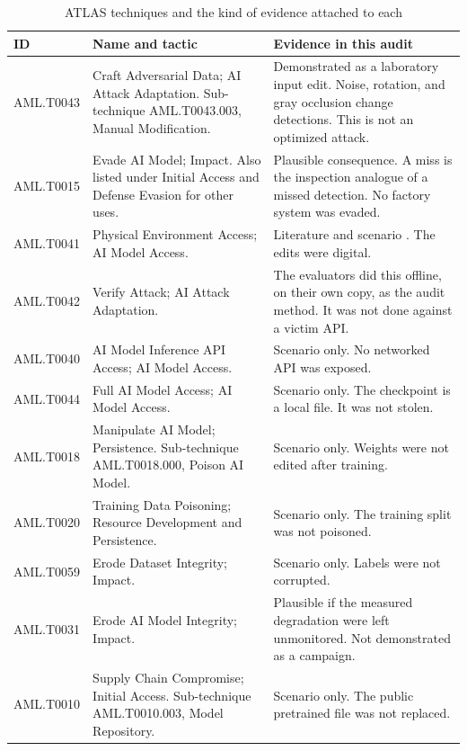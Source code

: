 \documentclass[conference]{IEEEtran}
\begin{document}
\begin{table}[t]
\caption{ATLAS techniques and the kind of evidence attached to each}
\label{tab:atlas}
\centering
\footnotesize
\setlength{\tabcolsep}{4pt}
\begin{tabular}{@{}>{\raggedright\arraybackslash}p{}>{\raggedright\arraybackslash}p{}>{\raggedright\arraybackslash}p{}@{}}
\toprule
ID & Name and tactic & Evidence in this audit \\
\midrule
AML.T0043 & Craft Adversarial Data; AI Attack Adaptation. Sub-technique AML.T0043.003, Manual Modification. & Demonstrated as a laboratory input edit. Noise, rotation, and gray occlusion change detections. This is not an optimized attack. \\
AML.T0015 & Evade AI Model; Impact. Also listed under Initial Access and Defense Evasion for other uses. & Plausible consequence. A miss is the inspection analogue of a missed detection. No factory system was evaded. \\
AML.T0041 & Physical Environment Access; AI Model Access. & Literature and scenario \cite{eykholt2018physical,lee2019patch}. The edits were digital. \\
AML.T0042 & Verify Attack; AI Attack Adaptation. & The evaluators did this offline, on their own copy, as the audit method. It was not done against a victim API. \\
AML.T0040 & AI Model Inference API Access; AI Model Access. & Scenario only. No networked API was exposed. \\
AML.T0044 & Full AI Model Access; AI Model Access. & Scenario only. The checkpoint is a local file. It was not stolen. \\
AML.T0018 & Manipulate AI Model; Persistence. Sub-technique AML.T0018.000, Poison AI Model. & Scenario only. Weights were not edited after training. \\
AML.T0020 & Training Data Poisoning; Resource Development and Persistence. & Scenario only. The training split was not poisoned. \\
AML.T0059 & Erode Dataset Integrity; Impact. & Scenario only. Labels were not corrupted. \\
AML.T0031 & Erode AI Model Integrity; Impact. & Plausible if the measured degradation were left unmonitored. Not demonstrated as a campaign. \\
AML.T0010 & Supply Chain Compromise; Initial Access. Sub-technique AML.T0010.003, Model Repository. & Scenario only. The public pretrained file was not replaced. \\
\bottomrule
\end{tabular}
\end{table}
\end{document}
